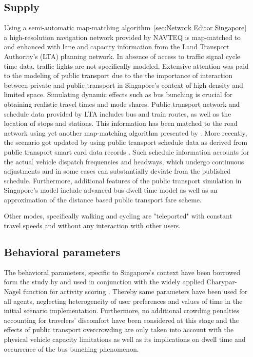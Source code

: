 \subsection{Supply}
Using a semi-automatic map-matching algorithm~\ref{sec:Network Editor Singapore} a high-resolution navigation network provided by NAVTEQ is map-matched to and enhanced with lane and capacity information from the Land Transport Authority's (LTA) planning network. In absence of access to traffic signal cycle time data, traffic lights are not specifically modeled. Extensive attention was paid to the modeling of public transport due to the the importance of interaction between private and public transport in Singapore’s context of high density and limited space. Simulating dynamic effects such as bus bunching is crucial for obtaining realistic travel times and mode shares. Public transport network and schedule data provided by LTA includes bus and train routes,  as well as the location of stops and stations. This information has been matched to the road network using yet another map-matching algorithm presented by \citet[][]{Ordonez_HKSTS_2011, Ordonez_Webpage_2011_4}. More recently, the scenario got updated by using public transport schedule data as derived from public transport smart card data records \citet[][]{Fourie_TechRep_FCL_2014}. Such schedule information accounts for the actual vehicle dispatch frequencies and headways, which undergo continuous adjustments and in some cases can substantially deviate from the published schedule. Furthermore, additional features of the public transport simulation in Singapore’s model include advanced bus dwell time model \citep[][]{SunEtAl_TransResA_2014} as well as an approximation of the distance based public transport fare scheme.

Other modes, specifically walking and cycling are "teleported" with constant travel speeds and without any interaction with other users. 

\subsection{Behavioral parameters}
The behavioral parameters, specific to Singapore's context have been borrowed form the study by \citet[][]{LTA_unpub_2009} and used in conjunction with the widely applied Charypar-Nagel function for activity scoring \citet[][]{CharyparNagel_Transportation_2005}. Thereby same parameters have been used for all agents, neglecting heterogeneity of user preferences and values of time in the initial scenario implementation. Furthermore, no additional crowding penalties accounting for travelers' discomfort have been considered at this stage and the effects of public transport overcrowding are only taken into account with the physical vehicle capacity limitations as well as its implications on dwell time and occurrence of the bus bunching phenomenon. 

